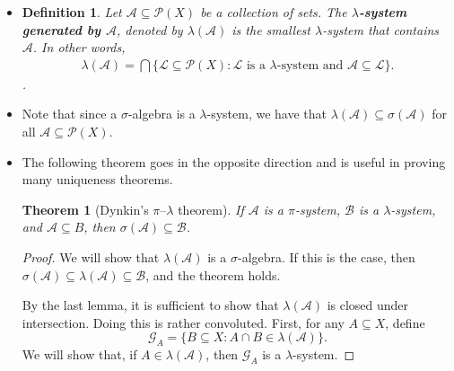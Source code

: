 \documentclass[10pt]{article}
\newtheorem{theorem}[lemma]{Theorem}
\newtheorem{definition}[lemma]{Definition}
\newcommand{\mcal}[1]{\mathcal{#1}}
\begin{document}
\begin{itemize}
  \begin{proof}
    We only need to show that $\mcal{A}$ is closed under countable (general) unions. Let $(A_n)$ be a sequence of sets in $\mcal{A}$. Let $B_n = A_n \cap A_{n-1}^c \cap A_{n-2}^c \cap \dotsb A_1^c$. We have that $B_n \in \mcal{A}$ because it is formed by finite intersections. Moreover, the $B_n$'s are disjoint from one other, so $\bigcup_{n=1}^\infty B_n = \bigcup_{n=1}^\infty A_n$ is a member of $\mcal{A}$ as well.
  \end{proof}

  \item \begin{definition}
    Let $\mcal{A} \subseteq \mcal{P}(X)$ be a collection of sets. The {\bf $\lambda$-system generated by $\mcal{A}$}, denoted by $\lambda(\mcal{A})$ is the smallest $\lambda$-system that contains $\mcal{A}$. In other words,
    \begin{align*}
      \lambda(\mcal{A}) = \bigcap \bigg\{ \mcal{L} \subseteq \mcal{P}(X): \mbox{$\mcal{L}$ is a $\lambda$-system and $\mcal{A} \subseteq \mcal{L}$} \bigg\}.
    \end{align*}.
  \end{definition}

  \item Note that since a $\sigma$-algebra is a $\lambda$-system, we have that $\lambda(\mcal{A}) \subseteq \sigma(\mcal{A})$ for all $\mcal{A} \subseteq \mcal{P}(X)$.

  \item The following theorem goes in the opposite direction and is useful in proving many uniqueness theorems.
  
  \begin{theorem}[Dynkin's $\pi$--$\lambda$ theorem] \label{theorem:dynkin-lambda-pi}
    If $\mcal{A}$ is a $\pi$-system, $\mcal{B}$ is a $\lambda$-system, and $\mcal{A} \subseteq B$, then $\sigma(\mcal{A}) \subseteq \mcal{B}$.
  \end{theorem}

  \begin{proof}
    We will show that $\lambda(\mcal{A})$ is a $\sigma$-algebra. If this is the case, then $\sigma(\mcal{A}) \subseteq \lambda(\mcal{A}) \subseteq \mcal{B}$, and the theorem holds.

    By the last lemma, it is sufficient to show that $\lambda(\mcal{A})$ is closed under intersection. Doing this is rather convoluted. First, for any $A \subseteq X$, define $$\mcal{G}_A = \{ B \subseteq X : A \cap B \in \mcal{\lambda}(\mcal{A}) \}.$$
    We will show that, if $A \in \lambda(\mcal{A})$, then $\mcal{G}_A$ is a $\lambda$-system. 


\end{proof}
\end{itemize}
\end{document}
